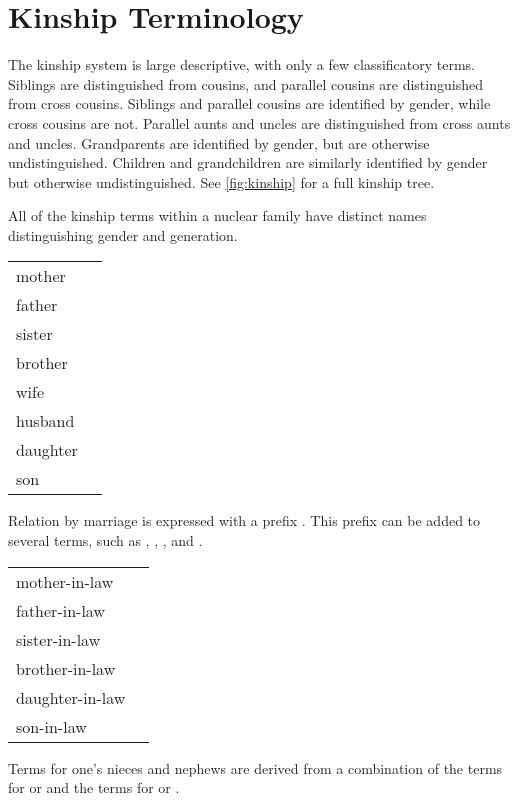 \chapter{Kinship Terminology}
\label{app:kinship}

The \langtvk{} kinship system is large descriptive, with only a few classificatory terms. Siblings are distinguished from cousins, and parallel cousins are distinguished from cross cousins. Siblings and parallel cousins are identified by gender, while cross cousins are not. Parallel aunts and uncles are distinguished from cross aunts and uncles. Grandparents are identified by gender, but are otherwise undistinguished. Children and grandchildren are similarly identified by gender but otherwise undistinguished. See \autoref{fig:kinship} for a full kinship tree.

All of the kinship terms within a nuclear family have distinct names distinguishing gender and generation.

\exdisplay\noexno
	\begin{tabu} {l l}
		mother & \\
		father & \\
		sister & \\
		brother & \\
		wife & \\
		husband & \\
		daughter & \\
		son & \\
	\end{tabu}
\xe

Relation by marriage is expressed with a prefix . This prefix can be added to several terms, such as , , , and .

\exdisplay\noexno
	\begin{tabu} {l l}
		mother-in-law & \\
		father-in-law & \\
		sister-in-law & \\
		brother-in-law & \\
		daughter-in-law & \\
		son-in-law & \\
	\end{tabu}
\xe

Terms for one's nieces and nephews are derived from a combination of the terms for  or  and the terms for  or .

